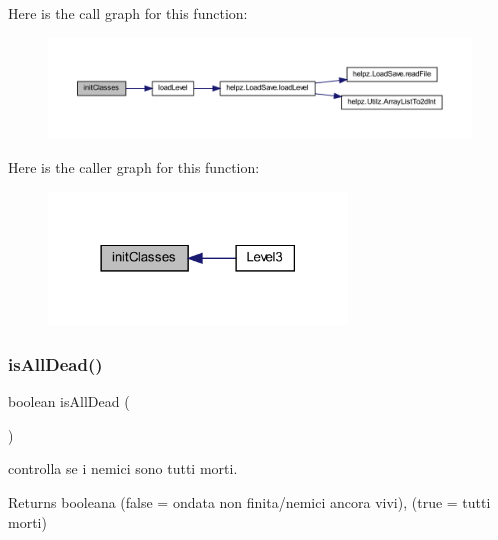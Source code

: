 Here is the call graph for this function\+:\nopagebreak
\begin{figure}[H]
\begin{center}
\leavevmode
\includegraphics[width=350pt]{classscenes_1_1_level3_afe125d345675ffefe8da7e96d39773f3_cgraph}
\end{center}
\end{figure}
Here is the caller graph for this function\+:\nopagebreak
\begin{figure}[H]
\begin{center}
\leavevmode
\includegraphics[width=225pt]{classscenes_1_1_level3_afe125d345675ffefe8da7e96d39773f3_icgraph}
\end{center}
\end{figure}
\mbox{\label{classscenes_1_1_level3_acd1846d50c3d8678777f9ab6716f5cf3}} 
\subsubsection{\texorpdfstring{is\+All\+Dead()}{isAllDead()}}
{\footnotesize\ttfamily boolean is\+All\+Dead (\begin{DoxyParamCaption}{ }\end{DoxyParamCaption})\hspace{0.3cm}{\ttfamily [private]}}



controlla se i nemici sono tutti morti. 

\begin{DoxyReturn}{Returns}
booleana (false = ondata non finita/nemici ancora vivi), (true = tutti morti) 
\end{DoxyReturn}


